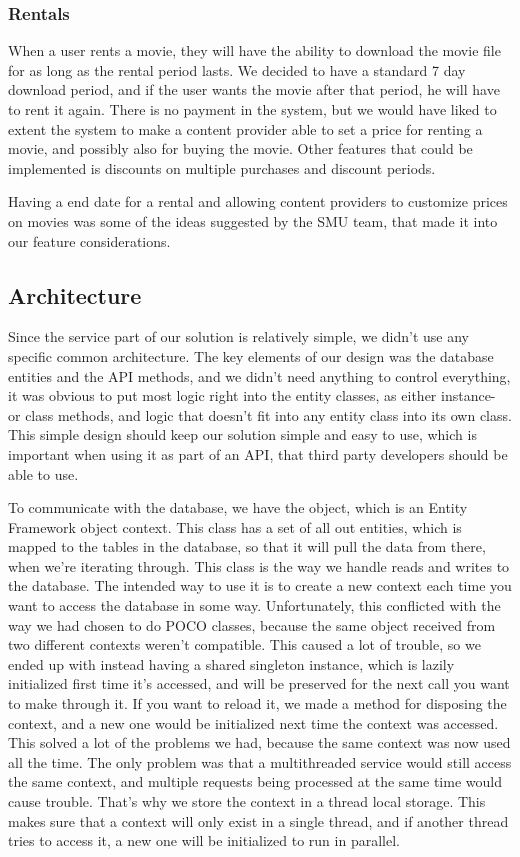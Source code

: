 \subsubsection{Rentals}
\label{Design_Service_Analysis_Rentals}
When a user rents a movie, they will have the ability to download the movie file for as long as the rental period lasts. We decided to have a standard 7 day download period, and if the user wants the movie after that period, he will have to rent it again. There is no payment in the system, but we would have liked to extent the system to make a content provider able to set a price for renting a movie, and possibly also for buying the movie. Other features that could be implemented is discounts on multiple purchases and discount periods.

Having a end date for a rental and allowing content providers to customize prices on movies was some of the ideas suggested by the SMU team, that made it into our feature considerations. 

\subsection{Architecture}
\label{Design_Service_Architecture}
Since the service part of our solution is relatively simple, we didn't use any specific common architecture. The key elements of our design was the database entities and the API methods, and we didn't need anything to control everything, it was obvious to put most logic right into the entity classes, as either instance- or class methods, and logic that doesn't fit into any entity class into its own class. This simple design should keep our solution simple and easy to use, which is important when using it as part of an API, that third party developers should be able to use.

To communicate with the database, we have the  object, which is an Entity Framework object context. This class has a set of all out entities, which is mapped to the tables in the database, so that it will pull the data from there, when we're iterating through. This class is the way we handle reads and writes to the database. The intended way to use it is to create a new context each time you want to access the database in some way. Unfortunately, this conflicted with the way we had chosen to do POCO classes, because the same object received from two different contexts weren't compatible. This caused a lot of trouble, so we ended up with instead having a shared singleton instance, which is lazily initialized first time it's accessed, and will be preserved for the next call you want to make through it. If you want to reload it, we made a method for disposing the context, and a new one would be initialized next time the context was accessed. This solved a lot of the problems we had, because the same context was now used all the time. The only problem was that a multithreaded service would still access the same context, and multiple requests being processed at the same time would cause trouble. That's why we store the context in a thread local storage. This makes sure that a context will only exist in a single thread, and if another thread tries to access it, a new one will be initialized to run in parallel.

